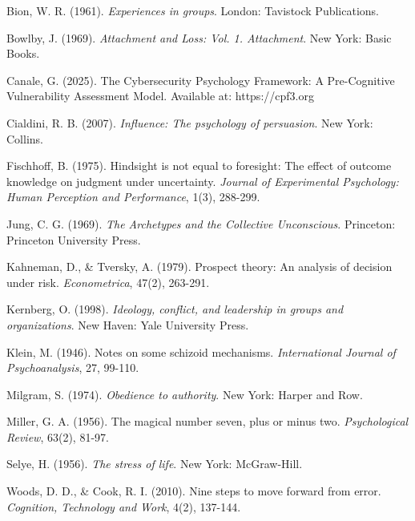 \documentclass[11pt,a4paper]{article}
\begin{document}
\begin{thebibliography}{99}

Bion, W. R. (1961). \textit{Experiences in groups}. London: Tavistock Publications.

Bowlby, J. (1969). \textit{Attachment and Loss: Vol. 1. Attachment}. New York: Basic Books.

Canale, G. (2025). The Cybersecurity Psychology Framework: A Pre-Cognitive Vulnerability Assessment Model. Available at: https://cpf3.org

Cialdini, R. B. (2007). \textit{Influence: The psychology of persuasion}. New York: Collins.

Fischhoff, B. (1975). Hindsight is not equal to foresight: The effect of outcome knowledge on judgment under uncertainty. \textit{Journal of Experimental Psychology: Human Perception and Performance}, 1(3), 288-299.

Jung, C. G. (1969). \textit{The Archetypes and the Collective Unconscious}. Princeton: Princeton University Press.

Kahneman, D., \& Tversky, A. (1979). Prospect theory: An analysis of decision under risk. \textit{Econometrica}, 47(2), 263-291.

Kernberg, O. (1998). \textit{Ideology, conflict, and leadership in groups and organizations}. New Haven: Yale University Press.

Klein, M. (1946). Notes on some schizoid mechanisms. \textit{International Journal of Psychoanalysis}, 27, 99-110.

Milgram, S. (1974). \textit{Obedience to authority}. New York: Harper and Row.

Miller, G. A. (1956). The magical number seven, plus or minus two. \textit{Psychological Review}, 63(2), 81-97.

Selye, H. (1956). \textit{The stress of life}. New York: McGraw-Hill.

Woods, D. D., \& Cook, R. I. (2010). Nine steps to move forward from error. \textit{Cognition, Technology and Work}, 4(2), 137-144.

\end{thebibliography}
\end{document}
